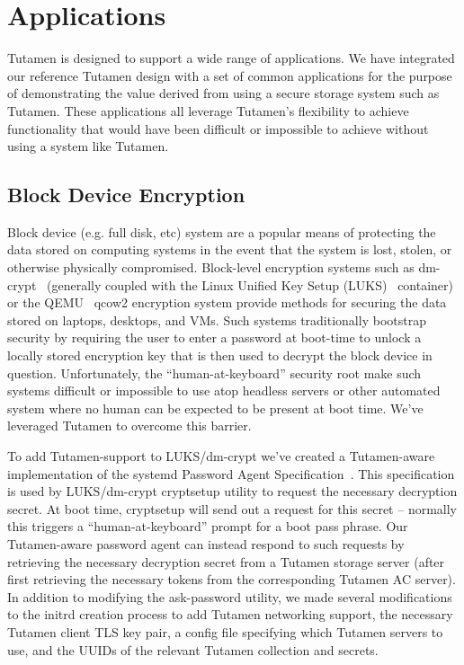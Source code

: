 \section{Applications}
\label{sec:apps}

Tutamen is designed to support a wide range of applications. We have
integrated our reference Tutamen design with a set of common
applications for the purpose of demonstrating the value derived from
using a secure storage system such as Tutamen. These applications all
leverage Tutamen's flexibility to achieve functionality that would
have been difficult or impossible to achieve without using a system
like Tutamen.

\subsection{Block Device Encryption}

Block device (e.g. full disk, etc) system are a popular means of
protecting the data stored on computing systems in the event that the
system is lost, stolen, or otherwise physically compromised.
Block-level encryption systems such as dm-crypt~\cite{dm-crypt}
(generally coupled with the Linux Unified Key Setup (LUKS)~\cite{luks}
container) or the QEMU~\cite{qemu} qcow2 encryption system provide
methods for securing the data stored on laptops, desktops, and
VMs. Such systems traditionally bootstrap security by requiring the
user to enter a password at boot-time to unlock a locally stored
encryption key that is then used to decrypt the block device in
question. Unfortunately, the ``human-at-keyboard'' security root make
such systems difficult or impossible to use atop headless servers or
other automated system where no human can be expected to be present at
boot time. We've leveraged Tutamen to overcome this barrier.

To add Tutamen-support to LUKS/dm-crypt we've created a Tutamen-aware
implementation of the systemd Password Agent
Specification~\cite{systemd-passwordagents}. This specification is
used by LUKS/dm-crypt cryptsetup utility to request the necessary
decryption secret. At boot time, cryptsetup will send out a request
for this secret -- normally this triggers a ``human-at-keyboard''
prompt for a boot pass phrase. Our Tutamen-aware password agent can
instead respond to such requests by retrieving the necessary
decryption secret from a Tutamen storage server (after first
retrieving the necessary tokens from the corresponding Tutamen AC
server). In addition to modifying the ask-password utility, we made
several modifications to the initrd creation process to add Tutamen
networking support, the necessary Tutamen client TLS key pair, a
config file specifying which Tutamen servers to use, and the UUIDs of
the relevant Tutamen collection and secrets.


